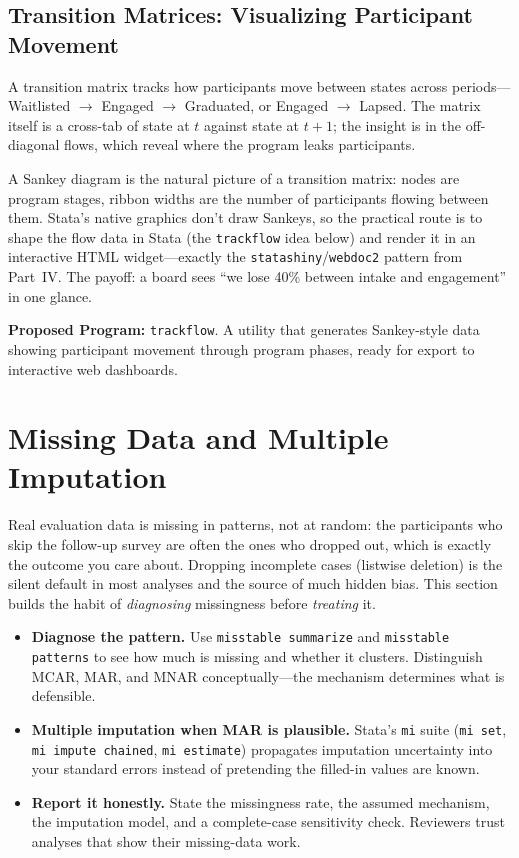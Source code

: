 \documentclass[
    a4paper,
    fontsize=10pt,
    twoside=true,
    numbers=noenddot,
]{kaobook}
\newenvironment{vizcallout}[1][Visualization to build]{%
    \begin{vizbox}[frametitle={#1}]%
}{%
    \end{vizbox}%
}
\begin{document}
\subsection{Transition Matrices: Visualizing Participant Movement}
A transition matrix tracks how participants move between states across periods---Waitlisted $\rightarrow$ Engaged $\rightarrow$ Graduated, or Engaged $\rightarrow$ Lapsed. The matrix itself is a cross-tab of state at $t$ against state at $t+1$; the insight is in the off-diagonal flows, which reveal where the program leaks participants.

\begin{vizcallout}[Visualization to build: the Sankey flow]
A Sankey diagram is the natural picture of a transition matrix: nodes are program stages, ribbon widths are the number of participants flowing between them. Stata's native graphics don't draw Sankeys, so the practical route is to shape the flow data in Stata (the \texttt{trackflow} idea below) and render it in an interactive HTML widget---exactly the \texttt{statashiny}/\texttt{webdoc2} pattern from Part~IV. The payoff: a board sees \enquote{we lose 40\% between intake and engagement} in one glance.
\end{vizcallout}

\begin{kaobox}[frametitle=Ado-file Idea: \texttt{trackflow}]
\textbf{Proposed Program:} \texttt{trackflow}. A utility that generates Sankey-style data showing participant movement through program phases, ready for export to interactive web dashboards.
\end{kaobox}

\section{Missing Data and Multiple Imputation}
Real evaluation data is missing in patterns, not at random: the participants who skip the follow-up survey are often the ones who dropped out, which is exactly the outcome you care about. Dropping incomplete cases (listwise deletion) is the silent default in most analyses and the source of much hidden bias. This section builds the habit of \emph{diagnosing} missingness before \emph{treating} it.
\begin{itemize}
    \item \textbf{Diagnose the pattern.} Use \texttt{misstable summarize} and \texttt{misstable patterns} to see how much is missing and whether it clusters. Distinguish MCAR, MAR, and MNAR conceptually---the mechanism determines what is defensible.
    \item \textbf{Multiple imputation when MAR is plausible.} Stata's \texttt{mi} suite (\texttt{mi set}, \texttt{mi impute chained}, \texttt{mi estimate}) propagates imputation uncertainty into your standard errors instead of pretending the filled-in values are known.
    \item \textbf{Report it honestly.} State the missingness rate, the assumed mechanism, the imputation model, and a complete-case sensitivity check. Reviewers trust analyses that show their missing-data work.
\end{itemize}
\end{document}
